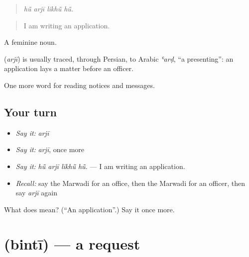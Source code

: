 \begin{quote}
   
\end{quote}

\begin{quote}
\emph{hū̃ arjī likhū̃ hū̃.}
\end{quote}

\begin{quote}
I am writing an application.
\end{quote}

A feminine noun.

\begin{cousinweb}
\textbf{} (\emph{arjī}) is usually traced, through Persian, to Arabic \emph{ʿarḍ}, \textquotedblleft{}a presenting\textquotedblright{}: an application lays a matter before an officer.
\end{cousinweb}

\begin{grammarlens}[title={What you've built}]
One more word for reading notices and messages.
\end{grammarlens}

\subsection*{Your turn}
\begin{itemize}
\raggedright
  \item \emph{Say it:} \emph{arjī}
  \item \emph{Say it:} \emph{arjī}, once more
  \item \emph{Say it:} \emph{hū̃ arjī likhū̃ hū̃.} — I am writing an application.
  \item \emph{Recall:} say the Marwadi for an office, then the Marwadi for an officer, then say \emph{arjī} again
\end{itemize}

\begin{tcolorbox}[breakable,colback=teal!4,colframe=teal!35!black,title={Before you move on}]
What does  mean? (\textquotedblleft{}An application\textquotedblright{}.) Say it once more.
\end{tcolorbox}
\section[\texorpdfstring{\mw{बिनती} (bintī)}{बिनती (bintī)}]{ (bintī) — a request}

\label{lesson:MW-C198-binti}



